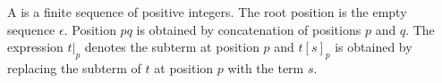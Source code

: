 %
\begin{definition}\label{def:position}
A  is a finite sequence of positive integers.
The root position is the empty sequence \( \epsilon \).
Position \( pq \) is obtained by concatenation of positions \( p \) and \( q \).
%
The expression \( t|_p \) denotes the subterm at position \( p \)
and \( t[s]_p \) is obtained by replacing the subterm of \( t \) at position \( p \) with the term \( s \).
%
\end{definition}
